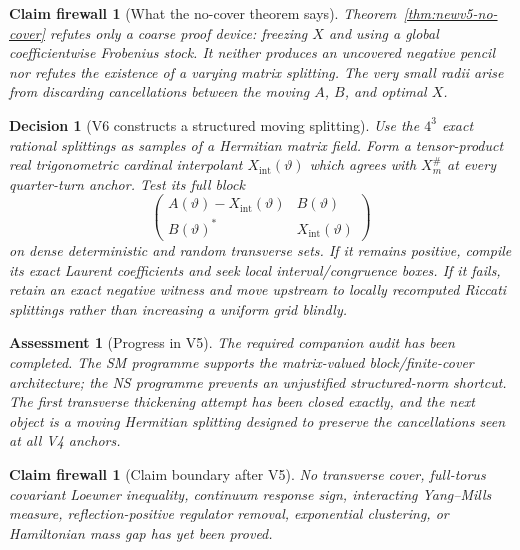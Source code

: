 \documentclass[11pt,oneside]{article}
\newtheorem{assessment}[theorem]{Assessment}
\newtheorem{firewall}[theorem]{Claim firewall}
\newtheorem{decision}[theorem]{Decision}
\theoremstyle{definition}
\theoremstyle{remark}
\begin{document}
\begin{firewall}[What the no-cover theorem says]
\label{fire:newv5-no-cover}
Theorem~\ref{thm:newv5-no-cover} refutes only a coarse proof device:
freezing \(X\) and using a global coefficientwise Frobenius stock.
It neither produces an uncovered negative pencil nor refutes the
existence of a varying matrix splitting.  The very small radii arise
from discarding cancellations between the moving \(A\), \(B\), and
optimal \(X\).
\end{firewall}

\begin{decision}[V6 constructs a structured moving splitting]
\label{dec:newv5-next}
Use the \(4^3\) exact rational splittings as samples of a Hermitian
matrix field.  Form a tensor-product real trigonometric cardinal
interpolant \(X_{\mathrm{int}}(\vartheta)\) which agrees with
\(X_m^\#\) at every quarter-turn anchor.  Test its full block
\[
 \begin{pmatrix}
 A(\vartheta)-X_{\mathrm{int}}(\vartheta)&B(\vartheta)\\
 B(\vartheta)^*&X_{\mathrm{int}}(\vartheta)
 \end{pmatrix}                                            \tag{5.11}
\]
on dense deterministic and random transverse sets.  If it remains
positive, compile its exact Laurent coefficients and seek local
interval/congruence boxes.  If it fails, retain an exact negative
witness and move upstream to locally recomputed Riccati splittings
rather than increasing a uniform grid blindly.
\end{decision}

\begin{assessment}[Progress in V5]
\label{ass:newv5-progress}
The required companion audit has been completed.  The SM programme
supports the matrix-valued block/finite-cover architecture; the NS
programme prevents an unjustified structured-norm shortcut.  The
first transverse thickening attempt has been closed exactly, and the
next object is a moving Hermitian splitting designed to preserve the
cancellations seen at all V4 anchors.
\end{assessment}

\begin{firewall}[Claim boundary after V5]
\label{fire:newv5-final}
No transverse cover, full-torus covariant Loewner inequality,
continuum response sign, interacting Yang--Mills measure,
reflection-positive regulator removal, exponential clustering, or
Hamiltonian mass gap has yet been proved.
\end{firewall}
\end{document}

